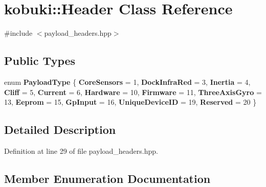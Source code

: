 \section{kobuki\-:\-:\-Header \-Class \-Reference}
\label{classkobuki_1_1Header}


{\ttfamily \#include $<$payload\-\_\-headers.\-hpp$>$}

\subsection*{\-Public \-Types}
\begin{DoxyCompactItemize}
\item 
enum {\bf \-Payload\-Type} \{ \*
{\bf \-Core\-Sensors} =  1, 
{\bf \-Dock\-Infra\-Red} =  3, 
{\bf \-Inertia} =  4, 
{\bf \-Cliff} =  5, 
\*
{\bf \-Current} =  6, 
{\bf \-Hardware} =  10, 
{\bf \-Firmware} =  11, 
{\bf \-Three\-Axis\-Gyro} =  13, 
\*
{\bf \-Eeprom} =  15, 
{\bf \-Gp\-Input} =  16, 
{\bf \-Unique\-Device\-I\-D} =  19, 
{\bf \-Reserved} =  20
 \}
\end{DoxyCompactItemize}


\subsection{\-Detailed \-Description}


\-Definition at line 29 of file payload\-\_\-headers.\-hpp.



\subsection{\-Member \-Enumeration \-Documentation}
